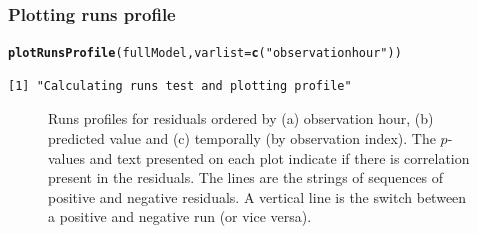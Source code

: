 \documentclass[11pt, a4paper]{article}
\makeatletter
\newcommand{\hlfunctioncall}[1]{\textcolor[rgb]{0.501960784313725,0,0.329411764705882}{\textbf{#1}}}%
\newcommand{\hlstring}[1]{\textcolor[rgb]{0.6,0.6,1}{#1}}%
\newenvironment{kframe}{%
 \def\at@end@of@kframe{}%
 \ifinner\ifhmode%
  \def\at@end@of@kframe{\end{minipage}}%
  \begin{minipage}{\columnwidth}%
 \fi\fi%
 \def\FrameCommand##1{\hskip\@totalleftmargin \hskip-\fboxsep
 \colorbox{shadecolor}{##1}\hskip-\fboxsep
     \hskip-\linewidth \hskip-\@totalleftmargin \hskip\columnwidth}%
 \MakeFramed {\advance\hsize-\width
   \@totalleftmargin\z@ \linewidth\hsize
   \@setminipage}}%
 {\par\unskip\endMakeFramed%
 \at@end@of@kframe}
\newenvironment{knitrout}{}{} %
\makeatother
\begin{document}
\begin{frame}[fragile]
\frametitle{Plotting runs profile}
\begin{knitrout}\footnotesize
{}\color{fgcolor}\begin{kframe}
\begin{alltt}
\hlfunctioncall{plotRunsProfile}(fullModel,  varlist = \hlfunctioncall{c}(\hlstring{"observationhour"}))
\end{alltt}
\begin{verbatim}
[1] "Calculating runs test and plotting profile"
\end{verbatim}
\end{kframe}
\end{knitrout}

\begin{figure}[h]
  \centering
  \hfill
  \hfill
  \hfill
\caption{Runs profiles for residuals ordered by (a) observation hour, (b) predicted value and (c) temporally (by observation index). The $p$-values and text presented on each plot indicate if there is correlation present in the residuals.  The lines are the strings of sequences of positive and negative residuals.  A vertical line is the switch between a positive and negative run (or vice versa).}
\label{fig:runs1}
\end{figure}
\end{frame}
\end{document}
